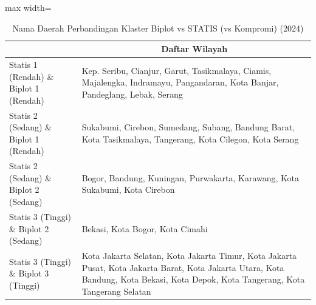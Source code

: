 \begin{table}[H]
\centering
\caption{Nama Daerah Perbandingan Klaster Biplot vs STATIS (vs Kompromi) (2024)} \label{tab:app1biplot_statis_name_2024}
\begin{adjustbox}{max width=\textwidth}
\begin{tabular}{|>{\centering\arraybackslash}p{4cm}|p{10cm}|}
\hline
\multicolumn{1}{|c|}{\textbf{Kategori}} & \multicolumn{1}{c|}{\textbf{Daftar Wilayah}} \\
\hline
Statis 1 (Rendah) \& Biplot 1 (Rendah) & Kep. Seribu, Cianjur, Garut, Tasikmalaya, Ciamis, Majalengka, Indramayu, Pangandaran, Kota Banjar, Pandeglang, Lebak, Serang \\
\hline
Statis 2 (Sedang) \& Biplot 1 (Rendah) & Sukabumi, Cirebon, Sumedang, Subang, Bandung Barat, Kota Tasikmalaya, Tangerang, Kota Cilegon, Kota Serang \\
\hline
Statis 2 (Sedang) \& Biplot 2 (Sedang) & Bogor, Bandung, Kuningan, Purwakarta, Karawang, Kota Sukabumi, Kota Cirebon \\
\hline
Statis 3 (Tinggi) \& Biplot 2 (Sedang) & Bekasi, Kota Bogor, Kota Cimahi \\
\hline
Statis 3 (Tinggi) \& Biplot 3 (Tinggi) & Kota Jakarta Selatan, Kota Jakarta Timur, Kota Jakarta Pusat, Kota Jakarta Barat, Kota Jakarta Utara, Kota Bandung, Kota Bekasi, Kota Depok, Kota Tangerang, Kota Tangerang Selatan \\
\hline
\end{tabular}
\end{adjustbox}
\end{table}